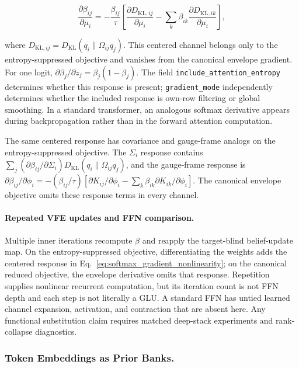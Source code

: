 \documentclass[twoside,11pt]{article}
\begin{document}
\begin{equation}
\frac{\partial \beta_{ij}}{\partial \mu_i} = -\frac{\beta_{ij}}{\tau}\left[\frac{\partial D_{\mathrm{KL},ij}}{\partial \mu_i} - \sum_k \beta_{ik} \frac{\partial D_{\mathrm{KL},ik}}{\partial \mu_i}\right],
\label{eq:softmax_gradient_nonlinearity}
\end{equation}

where $D_{\mathrm{KL},ij}=D_{\mathrm{KL}}(q_i\|\Omega_{ij}q_j)$. This centered channel belongs only to the entropy-suppressed objective and vanishes from the canonical envelope gradient. For one logit, $\partial\beta_j/\partial z_j=\beta_j(1-\beta_j)$. The field \texttt{include\_attention\_entropy} determines whether this response is present; \texttt{gradient\_mode} independently determines whether the included response is own-row filtering or global smoothing. In a standard transformer, an analogous softmax derivative appears during backpropagation rather than in the forward attention computation.

The same centered response has covariance and gauge-frame analogs on the entropy-suppressed objective. The $\Sigma_i$ response contains $\sum_j(\partial\beta_{ij}/\partial\Sigma_i)D_{\mathrm{KL}}(q_i\|\Omega_{ij}q_j)$, and the gauge-frame response is $\partial\beta_{ij}/\partial\phi_i=-(\beta_{ij}/\tau)[\partial K_{ij}/\partial\phi_i-\sum_k\beta_{ik}\partial K_{ik}/\partial\phi_i]$. The canonical envelope objective omits these response terms in every channel.

\paragraph{Repeated VFE updates and FFN comparison.}
Multiple inner iterations recompute $\beta$ and reapply the target-blind belief-update map. On the entropy-suppressed objective, differentiating the weights adds the centered response in Eq.~\eqref{eq:softmax_gradient_nonlinearity}; on the canonical reduced objective, the envelope derivative omits that response. Repetition supplies nonlinear recurrent computation, but its iteration count is not FFN depth and each step is not literally a GLU. A standard FFN has untied learned channel expansion, activation, and contraction that are absent here. Any functional substitution claim requires matched deep-stack experiments and rank-collapse diagnostics.

\subsubsection{Token Embeddings as Prior Banks.}
\label{sec:embeddings}
\end{document}
